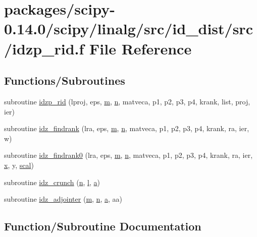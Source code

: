 \hypertarget{idzp__rid_8f}{}\section{packages/scipy-\/0.14.0/scipy/linalg/src/id\+\_\+dist/src/idzp\+\_\+rid.f File Reference}
\label{idzp__rid_8f}
\subsection*{Functions/\+Subroutines}
\begin{DoxyCompactItemize}
\item 
subroutine \hyperlink{idzp__rid_8f_aa72dbb70eb1e2de2aae0013dac4113e9}{idzp\+\_\+rid} (lproj, eps, \hyperlink{indexexpr_8h_ab72fdb4031d47b75ab26dd18a437bcdc}{m}, \hyperlink{indexexpr_8h_ab427e2e2b4d6cec55fa088ea2a692ace}{n}, matveca, p1, p2, p3, p4, krank, list, proj, ier)
\item 
subroutine \hyperlink{idzp__rid_8f_a38a599c6d6b3600e35de660cc33cbcde}{idz\+\_\+findrank} (lra, eps, \hyperlink{indexexpr_8h_ab72fdb4031d47b75ab26dd18a437bcdc}{m}, \hyperlink{indexexpr_8h_ab427e2e2b4d6cec55fa088ea2a692ace}{n}, matveca, p1, p2, p3, p4, krank, ra, ier, w)
\item 
subroutine \hyperlink{idzp__rid_8f_a12ab79a6f292ccabac7528457134a68f}{idz\+\_\+findrank0} (lra, eps, \hyperlink{indexexpr_8h_ab72fdb4031d47b75ab26dd18a437bcdc}{m}, \hyperlink{indexexpr_8h_ab427e2e2b4d6cec55fa088ea2a692ace}{n}, matveca, p1, p2, p3, p4, krank, ra, ier, \hyperlink{vecnorm1_8cc_ac73eed9e41ec09d58f112f06c2d6cb63}{x}, y, \hyperlink{dense_8h_a0440a74729365d9e7ed71b8f3927a27f}{scal})
\item 
subroutine \hyperlink{idzp__rid_8f_a2c036fd85968d9b0cf02d3e8faea2fe8}{idz\+\_\+crunch} (\hyperlink{indexexpr_8h_ab427e2e2b4d6cec55fa088ea2a692ace}{n}, \hyperlink{indexexpr_8h_a88aacdaa46b76729743ee33ef8b95a58}{l}, \hyperlink{gen__mat5files_8m_aae328bf20413f220e38aec4d95bfd6da}{a})
\item 
subroutine \hyperlink{idzp__rid_8f_a4755dc1ee4e634b631b74bcd2204c9e8}{idz\+\_\+adjointer} (\hyperlink{indexexpr_8h_ab72fdb4031d47b75ab26dd18a437bcdc}{m}, \hyperlink{indexexpr_8h_ab427e2e2b4d6cec55fa088ea2a692ace}{n}, \hyperlink{gen__mat5files_8m_aae328bf20413f220e38aec4d95bfd6da}{a}, aa)
\end{DoxyCompactItemize}


\subsection{Function/\+Subroutine Documentation}
\hypertarget{idzp__rid_8f_a4755dc1ee4e634b631b74bcd2204c9e8}{}
